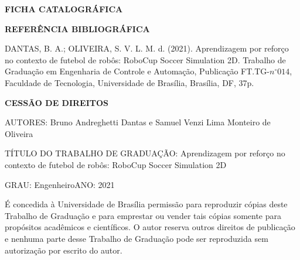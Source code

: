 \noindent \textbf{FICHA CATALOGRÁFICA}

\noindent %

\noindent \medskip{}


\noindent \textbf{REFERÊNCIA BIBLIOGRÁFICA}

DANTAS, B. A.; OLIVEIRA, S. V. L. M. d. (2021). Aprendizagem por reforço no contexto de futebol de robôs: RoboCup Soccer Simulation 2D. Trabalho de Graduação
em Engenharia de Controle e Automação, Publicação FT.TG-$n^{\circ}014$,
Faculdade de Tecnologia, Universidade de Brasília, Brasília, DF, 37p.

\noindent \bigskip{}


\noindent \textbf{CESSÃO DE DIREITOS}

\noindent AUTORES: Bruno Andreghetti Dantas e Samuel Venzi Lima Monteiro de Oliveira

TÍTULO DO TRABALHO DE GRADUAÇÃO: Aprendizagem por reforço no contexto de futebol de robôs: RoboCup Soccer Simulation 2D

\noindent \medskip{}


\noindent GRAU: Engenheiro\hfill{}ANO: 2021\hfill{}

\noindent \medskip{}


É concedida à Universidade de Brasília permissão para reproduzir cópias
deste Trabalho de Graduação e para emprestar ou vender tais cópias
somente para propósitos acadêmicos e científicos. O autor reserva
outros direitos de publicação e nenhuma parte desse Trabalho de Graduação
pode ser reproduzida sem autorização por escrito do autor.

